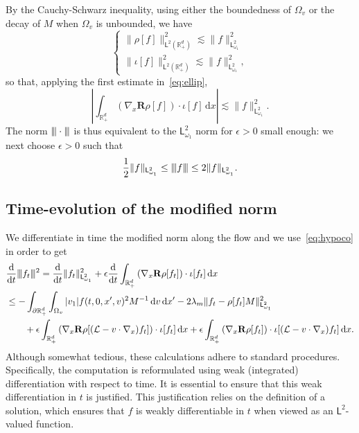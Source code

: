 \documentclass[11pt]{amsart}
\theoremstyle{definition}
\theoremstyle{remark}
\numberwithin{equation}{section}
\newcommand{\Nt}{|\hskip-0.04cm|\hskip-0.04cm|}
\newcommand\R{{\mathbb R}}
\def\LL{{\mathcal L}}
\newcommand{\dd}{{\, \mathrm d}}
\newcommand{\dt}{\frac{{\rm d}}{{\rm d}t}}
\newcommand{\sfL}{\mathsf{L}}
\begin{document}
By the Cauchy-Schwarz inequality, using either the boundedness of $\Omega_v$ or the decay of $M$ when $\Omega_v$ is unbounded, we have
\begin{equation}
  \label{eq:borne-rho&iota}
  \begin{cases}
    \| \rho[f] \|_{\sfL^{2}(\R^d_+)} ^2 \lesssim \| f \|_{\sfL^2_{\omega_1}} ^2 \\[2mm]
    \| \iota[f] \|_{\sfL^{2}(\R^d_+)} ^2 \lesssim \| f \|_{\sfL^2_{\omega_1}}^2,
  \end{cases}
\end{equation}
so that, applying the first estimate in~\eqref{eq:ellip},
\begin{equation*}
  \left| \int_{\R_+^d} \left( \nabla_x \mathbf R \rho[f] \right) \cdot \iota[f] \dd x \right| \lesssim \| f \|_{\sfL^2_{\omega_1}} ^2.
\end{equation*}
The norm $\Nt \cdot \Nt$ is thus equivalent to the $\sfL^{2}_{\omega_1}$ norm for $\epsilon >0$ small enough:  we next choose $\epsilon > 0$ such that
\begin{equation}
  \label{eq:equivNormeps}
  \frac12  \| f \|_{\sfL^2_{\omega_1}} \le \Nt f \Nt  \le 2  \| f \|_{\sfL^2_{\omega_1}}.
\end{equation}

\subsection{Time-evolution of the modified norm}

We differentiate in time the modified norm along the flow and we use~\eqref{eq:hypoco} in order to get
\begin{align}
  \nonumber
  & \dt  \Nt f_t \Nt^2 = \dt \| f_t \|_{\sfL^2_{\omega_1}} ^2 + \epsilon \dt \int_{\R_+^d} \left( \nabla_x \mathbf R \rho[f_t] \right) \cdot \iota[f_t] \dd x \\
  \nonumber
  & \le - \int_{\partial \R_+^d} \int_{\Omega_v} |v_1| f(t,0,x',v)^2 M^{-1} \dd v \dd x' - 2 \lambda_m  \| f_t - \rho[f_t] M \|_{\sfL^2_{\omega_1}}^2 \\ \label{eq:estim-hypoco}
  & \qquad + \epsilon \int_{\R_+^d} \left( \nabla_x \mathbf R \rho[(\LL-v \cdot \nabla_x)f_t] \right) \cdot \iota[f_t] \dd x +  \epsilon \int_{\R_+^d} \left( \nabla_x \mathbf R \rho[f_t] \right) \cdot \iota[(\LL-v \cdot \nabla_x)f_t] \dd x.
\end{align}
Although somewhat tedious, these calculations adhere to standard procedures. Specifically, the computation is reformulated using weak (integrated) differentiation with respect to time. It is essential to ensure that this weak differentiation in $t$ is justified. This justification relies on the definition of a solution, which ensures that $f$ is weakly differentiable in $t$ when viewed as an $\sfL^2$-valued function.
\end{document}
